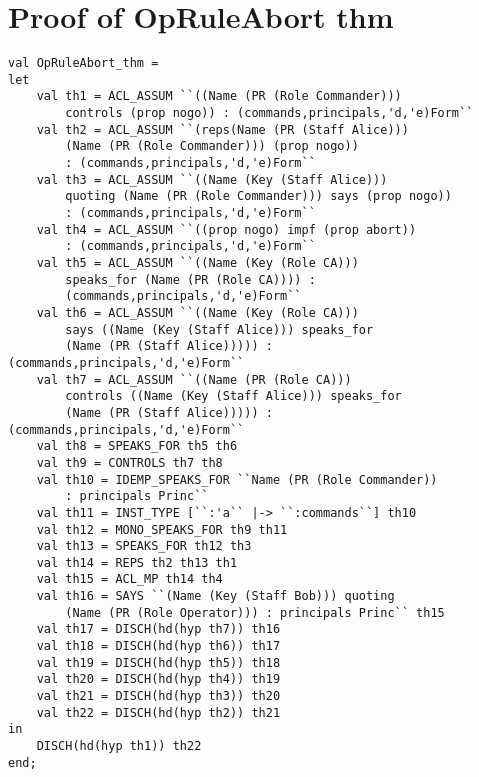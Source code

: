 \documentclass{report}
\begin{document}
\section{Proof of OpRuleAbort thm}
\label{proof-14-4-1-B}
\begin{lstlisting}[frame=TBlr]
val OpRuleAbort_thm =
let
	val th1 = ACL_ASSUM ``((Name (PR (Role Commander))) 
        controls (prop nogo)) : (commands,principals,'d,'e)Form``
	val th2 = ACL_ASSUM ``(reps(Name (PR (Staff Alice))) 
        (Name (PR (Role Commander))) (prop nogo)) 
        : (commands,principals,'d,'e)Form``
	val th3 = ACL_ASSUM ``((Name (Key (Staff Alice)))
        quoting (Name (PR (Role Commander))) says (prop nogo)) 
        : (commands,principals,'d,'e)Form``
	val th4 = ACL_ASSUM ``((prop nogo) impf (prop abort)) 
        : (commands,principals,'d,'e)Form``
	val th5 = ACL_ASSUM ``((Name (Key (Role CA))) 
        speaks_for (Name (PR (Role CA)))) : 
        (commands,principals,'d,'e)Form``
	val th6 = ACL_ASSUM ``((Name (Key (Role CA))) 
        says ((Name (Key (Staff Alice))) speaks_for 
        (Name (PR (Staff Alice))))) : (commands,principals,'d,'e)Form``
	val th7 = ACL_ASSUM ``((Name (PR (Role CA))) 
        controls ((Name (Key (Staff Alice))) speaks_for 
        (Name (PR (Staff Alice))))) : (commands,principals,'d,'e)Form``
 	val th8 = SPEAKS_FOR th5 th6
 	val th9 = CONTROLS th7 th8
 	val th10 = IDEMP_SPEAKS_FOR ``Name (PR (Role Commander)) 
        : principals Princ``
 	val th11 = INST_TYPE [``:'a`` |-> ``:commands``] th10
 	val th12 = MONO_SPEAKS_FOR th9 th11
 	val th13 = SPEAKS_FOR th12 th3
 	val th14 = REPS th2 th13 th1
 	val th15 = ACL_MP th14 th4
 	val th16 = SAYS ``(Name (Key (Staff Bob))) quoting 
        (Name (PR (Role Operator))) : principals Princ`` th15
 	val th17 = DISCH(hd(hyp th7)) th16
 	val th18 = DISCH(hd(hyp th6)) th17
 	val th19 = DISCH(hd(hyp th5)) th18
 	val th20 = DISCH(hd(hyp th4)) th19
 	val th21 = DISCH(hd(hyp th3)) th20
 	val th22 = DISCH(hd(hyp th2)) th21
in
	DISCH(hd(hyp th1)) th22
end;
\end{lstlisting}
\end{document}
